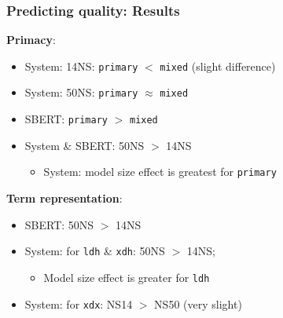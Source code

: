 \documentclass[handout,xcolor={dvipsnames}]{beamer}
\newcommand{\param}[1]{\texttt{#1}}
\begin{document}
\begin{frame}
\frametitle{Predicting quality: Results}

\vspace{-.5em}

\pause
\textbf{Primacy}:
\begin{itemize}
\pause
\item System: 14NS: \param{primary} $<$ \param{mixed} (slight difference)
\pause
\item System: 50NS: \param{primary} $\approx$ \param{mixed}
\pause
\item SBERT: \param{primary} $>$ \param{mixed}
\pause
\item System \& SBERT: 50NS $>$ 14NS
\begin{itemize}
\pause
\item System: model size effect is greatest for \param{primary}
\end{itemize}
\end{itemize}

\vspace{1em}

\pause
\textbf{Term representation}:
\begin{itemize}
\pause
\item SBERT: 50NS $>$ 14NS
\pause
\item System: for \param{ldh} \& \param{xdh}: 50NS $>$ 14NS;
\begin{itemize}
\pause
\item Model size effect is greater for \param{ldh}
\end{itemize}
\pause
\item System: for \param{xdx}: NS14 $>$ NS50 (very slight)
\end{itemize}

\end{frame}
\end{document}
